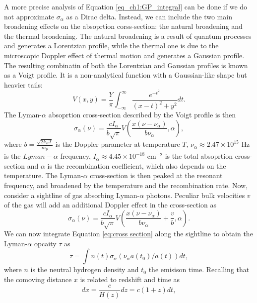 A more precise analysis of Equation \ref{eq_ch1:GP_integral} can be done if we do not approximate $\sigma_\alpha$ as a Dirac delta. Instead, we can include the two main broadening effects on the absoprtion corss-section: the natural broadening and the thermal broadening. The natural broadening is a result of quantum processes and generates a Lorentzian profile, while the thermal one is due to the microscopic Doppler effect of thermal motion and generates a Gaussian profile. The resulting combinatin of both the Lorentzian and Gaussian profiles is known as a Voigt profile. It is a non-analytical function with a Gaussian-like shape but heavier tails:
\begin{equation}\label{eq: Voigt}
    V(x,y)=\frac{Y}{\pi}\int_{-\infty}^{\infty}\frac{e^{-t^2}}{(x-t)^2+y^2} dt.
\end{equation}
The Lyman-$\alpha$ absoprtion cross-section described by the Voigt profile is then
\begin{equation}
    \sigma_\alpha(\nu)=\frac{cI_\alpha}{b\sqrt{\pi}} V\left(\frac{x(\nu-\nu_\alpha)}{b\nu_\alpha}, \alpha  \right),
\end{equation}
where $b=\frac{\sqrt{2k_BT}}{m_p}$ is the Doppler parameter at temperature $T$, $\nu_\alpha \approx 2.47\times 10^{15}$ Hz is the $Lyman-\alpha$ frequency, $I_\alpha \approx 4.45\times 10^{-18}$ cm$^{-2}$ is the total absoprtion cross-section \cite{Mo2010} and $\alpha$ is the recombination coefficient, which also depends on the temperature.
The Lyman-$\alpha$ cross-section is then peaked at the resonant frequency, and broadened by the temperature and the recombination rate. Now, consider a sightline of gas absorbing Lyman-$\alpha$ photons. Peculiar bulk velocities $v$ of the gas will add an additional Doppler effect in the cross-section as
\begin{equation}\label{eq:cross section}
    \sigma_\alpha(\nu)=\frac{cI_\alpha}{b\sqrt{\pi}} V\left(\frac{x(\nu-\nu_\alpha)}{b\nu_\alpha} +\frac{v}{b}, \alpha  \right).
\end{equation}
We can now integrate Equation \ref{eq:cross section} along the sightline to obtain the Lyman-$\alpha$ opcaity $\tau$ as
\begin{equation}
    \tau = \int n(t)\sigma_\alpha(\nu_\alpha a(t_0)/a(t)) dt,
\end{equation}
where $n$ is the neutral hydrogen density and $t_0$ the emisison time.
Recalling that the comoving distance $x$ is related to redshift and time as 
\begin{equation}
    dx=\frac{c}{H(z)}dz=c(1+z)dt,
\end{equation}
